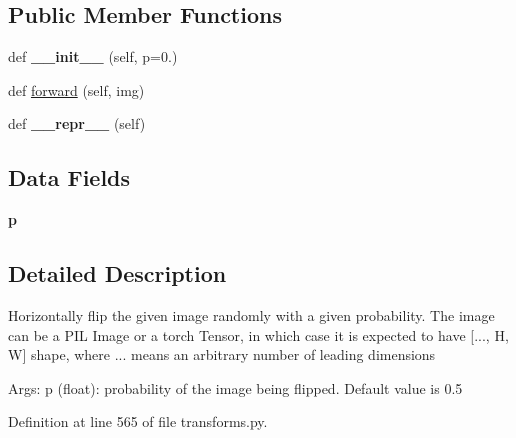 \subsection*{Public Member Functions}
\begin{DoxyCompactItemize}
\item 
\mbox{\label{classtorchvision_1_1transforms_1_1transforms_1_1RandomHorizontalFlip_a55cbd4a9f300e18537fbc4e40b5ebb55}} 
def {\bfseries \+\_\+\+\_\+init\+\_\+\+\_\+} (self, p=0.)
\item 
def \hyperlink{classtorchvision_1_1transforms_1_1transforms_1_1RandomHorizontalFlip_af963493e3a811fa32818de80f22e91ed}{forward} (self, img)
\item 
\mbox{\label{classtorchvision_1_1transforms_1_1transforms_1_1RandomHorizontalFlip_aed934f864effb3cade0f3fabf4f496d1}} 
def {\bfseries \+\_\+\+\_\+repr\+\_\+\+\_\+} (self)
\end{DoxyCompactItemize}
\subsection*{Data Fields}
\begin{DoxyCompactItemize}
\item 
\mbox{\label{classtorchvision_1_1transforms_1_1transforms_1_1RandomHorizontalFlip_a399630d0470fc74c98d08498bf68bbf1}} 
{\bfseries p}
\end{DoxyCompactItemize}


\subsection{Detailed Description}
\begin{DoxyVerb}Horizontally flip the given image randomly with a given probability.
The image can be a PIL Image or a torch Tensor, in which case it is expected
to have [..., H, W] shape, where ... means an arbitrary number of leading
dimensions

Args:
    p (float): probability of the image being flipped. Default value is 0.5
\end{DoxyVerb}
 

Definition at line 565 of file transforms.\+py.



